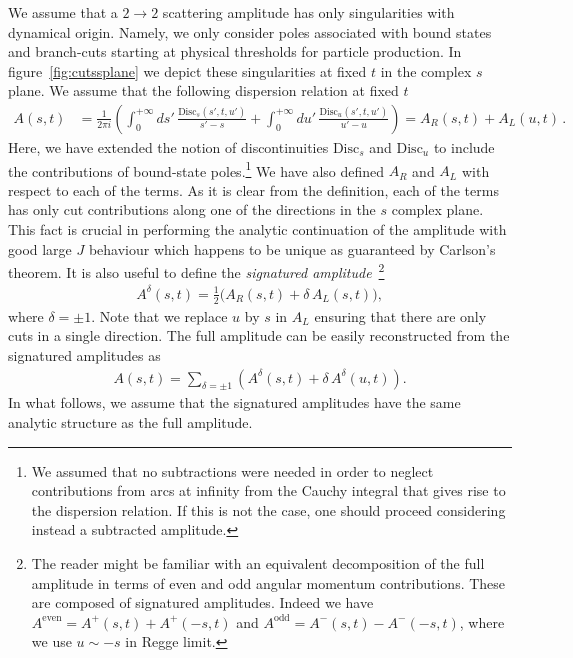 We assume that a $2\to2$ scattering amplitude has only singularities with dynamical origin. Namely, we only consider poles associated with bound states and branch-cuts starting at physical thresholds for particle production. In figure~\ref{fig:cutssplane} we depict these singularities at fixed $t$ in the complex $s$ plane. We assume that the following dispersion relation at fixed $t$ 
\begin{align}
  A(s,t) & =\frac{1}{2\pi i} \left(
  \int_{0}^{+\infty} \!\!\! ds' \, \frac{\text{Disc}_{s}(s',t,u')}{s'-s} + \int_{0}^{+\infty} \!\!\! du' \,\frac{\text{Disc}_{u}(s',t,u')}{u'-u} \right) =A_{R}(s,t)+A_{L}(u,t)\,.
\end{align}
Here, we have extended the notion of discontinuities $\text{Disc}_{s}$ and $\text{Disc}_{u}$ to include the contributions of bound-state poles.\footnote{We  assumed that no subtractions were needed in order to neglect contributions from arcs at infinity from the Cauchy integral that gives rise to the dispersion relation. If this is not the case, one should proceed considering instead a subtracted amplitude.}
We have also defined $A_{R}$ and $A_{L}$ with respect to each of the terms.
As it is clear from the definition, each of the terms has only cut contributions along one of the directions in the $s$ complex plane.
This fact is crucial in performing the analytic continuation of the amplitude with good large $J$ behaviour which happens to be unique as guaranteed by Carlson's theorem.
It is also useful to define the {\em signatured amplitude}~\footnote{The reader might be familiar with an equivalent decomposition of the full amplitude in terms of even and odd angular momentum contributions.
These are composed of signatured amplitudes.
Indeed we have $A^{\text{even}}=A^{+}(s,t)+A^{+}(-s,t)$ and $A^{\text{odd}}=A^{-}(s,t)-A^{-}(-s,t)$, where we use $u\sim-s$ in Regge limit.}
\begin{align}
  \label{eq:signaturedef}
  A^{\delta}(s,t)=\frac{1}{2}\big(A_{R}(s,t)+\delta\, A_{L}(s,t)\big) ,
\end{align}
where $\delta=\pm 1$.
Note that we replace $u$ by $s$ in $A_{L}$ ensuring that there are only cuts in a single direction.
The full amplitude can be easily reconstructed from the signatured amplitudes as
\begin{align}
  A(s,t)=\sum_{\delta=\pm 1}\left(A^{\delta}(s,t)+\delta\, A^{\delta}(u,t)\right) .
\end{align}
In what follows, we assume that the signatured amplitudes have the same analytic structure as the full amplitude.
